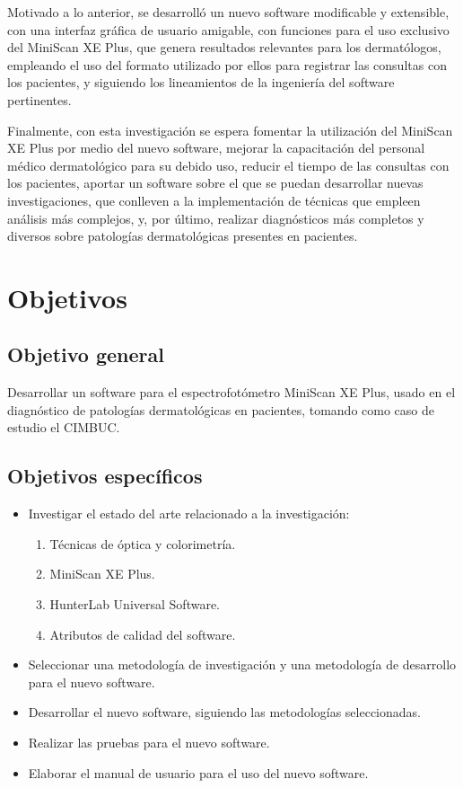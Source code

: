 Motivado a lo anterior, se desarroll\'{o} un nuevo software modificable y extensible, con una interfaz gr\'{a}fica de usuario amigable, con funciones para el uso exclusivo del MiniScan XE Plus, que genera resultados relevantes para los dermat\'{o}logos, empleando el uso del formato utilizado por ellos para registrar las consultas con los pacientes, y siguiendo los lineamientos de la ingenier\'{i}a del software pertinentes.

Finalmente, con esta investigaci\'{o}n se espera fomentar la utilizaci\'{o}n del \mbox{MiniScan} XE Plus por medio del nuevo software, mejorar la capacitaci\'{o}n del personal m\'{e}dico dermatol\'{o}gico para su debido uso, reducir el tiempo de las consultas con los pacientes, aportar un software sobre el que se puedan desarrollar nuevas investigaciones, que conlleven a la implementaci\'{o}n de t\'{e}cnicas que empleen an\'{a}lisis m\'{a}s complejos, y, por \'{u}ltimo, realizar diagn\'{o}sticos m\'{a}s completos y diversos sobre patolog\'{i}as dermatol\'{o}gicas presentes en pacientes.

	\section{Objetivos}

		\subsection{Objetivo general}
	Desarrollar un software para el espectrofot\'{o}metro MiniScan XE Plus, usado en el diagn\'{o}stico de patolog\'{i}as dermatol\'{o}gicas en pacientes, tomando como caso de estudio el CIMBUC.
		\subsection{Objetivos espec\'{i}ficos}
			\begin{itemize}
				\item Investigar el estado del arte relacionado a la investigaci\'{o}n:
				
				\begin{enumerate}
					\item T\'{e}cnicas de \'{o}ptica y colorimetr\'{i}a.
					\item MiniScan XE Plus.
					\item HunterLab Universal Software.
					\item Atributos de calidad del software.
				\end{enumerate}
				
				\item Seleccionar una metodolog\'{i}a de investigaci\'{o}n y una metodolog\'{i}a de desarrollo para el nuevo software.
				\item Desarrollar el nuevo software, siguiendo las metodolog\'{i}as \mbox{seleccionadas}.
				\item Realizar las pruebas para el nuevo software.
				\item Elaborar el manual de usuario para el uso del nuevo software.
			\end{itemize}

